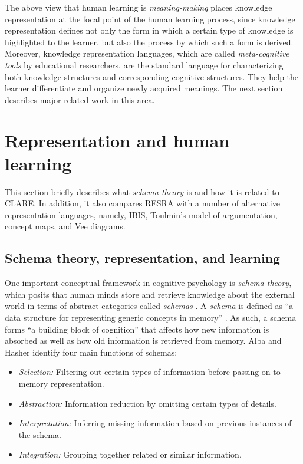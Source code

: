 The above view that human learning is {\it meaning-making} places knowledge
representation at the focal point of the human learning process, since
knowledge representation defines not only the form in which a certain type
of knowledge is highlighted to the learner, but also the process by which
such a form is derived. Moreover, knowledge representation languages, which
are called {\it meta-cognitive tools\/} by educational researchers, are the
standard language for characterizing both knowledge structures and
corresponding cognitive structures. They help the learner differentiate and
organize newly acquired meanings. The next section describes major related
work in this area.


\section{Representation and human learning}
\label{sec:representation}

This section briefly describes what {\it schema theory\/} is and how it is
related to CLARE. In addition, it also compares RESRA with a number of
alternative representation languages, namely, IBIS, Toulmin's model of
argumentation, concept maps, and Vee diagrams.


\subsection{Schema theory, representation, and learning}

One important conceptual framework in cognitive psychology is {\it schema
theory\/}, which posits that human minds store and retrieve knowledge about
the external world in terms of abstract categories called {\it schemas\/}
\cite{Stillings87}. A {\it schema\/} is defined as ``a data structure for
representing generic concepts in memory'' \cite{Rumelhart80}.  As such, a
schema forms ``a building block of cognition'' that affects how new
information is absorbed as well as how old information is retrieved
from memory. Alba and Hasher \cite{Alba83} identify four main functions of
schemas:

\begin{itemize}
\item {\it Selection:\/} Filtering out certain types of information before
  passing on to memory representation.
  
\item {\it Abstraction:\/} Information reduction by omitting certain
  types of details.
  
\item {\it Interpretation:\/} Inferring missing information based on
  previous instances of the schema.
  
\item {\it Integration:\/} Grouping together related or similar
  information.
\end{itemize}

